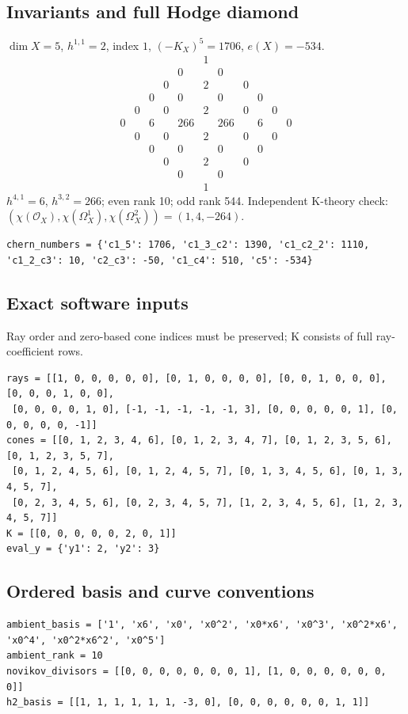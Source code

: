 \documentclass[10pt,a4paper]{article}
\begin{document}
\subsection*{Invariants and full Hodge diamond}
$\dim X=5$, $h^{1,1}=2$, index $1$, $(-K_X)^5=1706$, $e(X)=-534$.
\[\begin{array}{ccccccccccc}&&&&&1&&&&&\\&&&&0&&0&&&&\\&&&0&&2&&0&&&\\&&0&&0&&0&&0&&\\&0&&0&&2&&0&&0&\\0&&6&&266&&266&&6&&0\\&0&&0&&2&&0&&0&\\&&0&&0&&0&&0&&\\&&&0&&2&&0&&&\\&&&&0&&0&&&&\\&&&&&1&&&&&\end{array}\]
$h^{4,1}=6$, $h^{3,2}=266$; even rank 10; odd rank 544.
Independent K-theory check: $(\chi(\mathcal O_X),\chi(\Omega_X^1),\chi(\Omega_X^2))=(1, 4, -264)$.
\begin{lstlisting}
chern_numbers = {'c1_5': 1706, 'c1_3_c2': 1390, 'c1_c2_2': 1110, 'c1_2_c3': 10, 'c2_c3': -50, 'c1_c4': 510, 'c5': -534}
\end{lstlisting}
\subsection*{Exact software inputs}
Ray order and zero-based cone indices must be preserved; K consists of full ray-coefficient rows.
\begin{lstlisting}
rays = [[1, 0, 0, 0, 0, 0], [0, 1, 0, 0, 0, 0], [0, 0, 1, 0, 0, 0], [0, 0, 0, 1, 0, 0],
 [0, 0, 0, 0, 1, 0], [-1, -1, -1, -1, -1, 3], [0, 0, 0, 0, 0, 1], [0, 0, 0, 0, 0, -1]]
cones = [[0, 1, 2, 3, 4, 6], [0, 1, 2, 3, 4, 7], [0, 1, 2, 3, 5, 6], [0, 1, 2, 3, 5, 7],
 [0, 1, 2, 4, 5, 6], [0, 1, 2, 4, 5, 7], [0, 1, 3, 4, 5, 6], [0, 1, 3, 4, 5, 7],
 [0, 2, 3, 4, 5, 6], [0, 2, 3, 4, 5, 7], [1, 2, 3, 4, 5, 6], [1, 2, 3, 4, 5, 7]]
K = [[0, 0, 0, 0, 0, 2, 0, 1]]
eval_y = {'y1': 2, 'y2': 3}
\end{lstlisting}
\subsection*{Ordered basis and curve conventions}
\begin{lstlisting}
ambient_basis = ['1', 'x6', 'x0', 'x0^2', 'x0*x6', 'x0^3', 'x0^2*x6', 'x0^4', 'x0^2*x6^2', 'x0^5']
ambient_rank = 10
novikov_divisors = [[0, 0, 0, 0, 0, 0, 0, 1], [1, 0, 0, 0, 0, 0, 0, 0]]
h2_basis = [[1, 1, 1, 1, 1, 1, -3, 0], [0, 0, 0, 0, 0, 0, 1, 1]]
\end{lstlisting}
\end{document}
